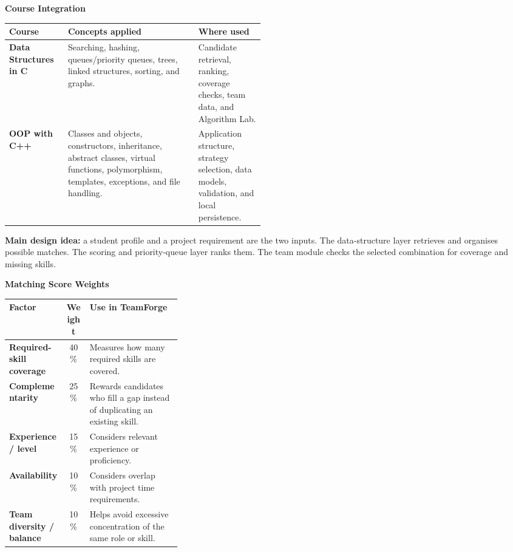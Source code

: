 \documentclass[a4paper,11pt]{article}
\begin{document}
\vspace{10pt}
\begin{answerbox}
\textbf{Course Integration}

\vspace{3pt}
\begin{tabularx}{\linewidth}{|>{\bfseries}p{0.23\linewidth}|X|p{0.26\linewidth}|}
\hline
Course & Concepts applied & Where used \\
\hline
Data Structures in C & Searching, hashing, queues/priority queues, trees, linked structures, sorting, and graphs. & Candidate retrieval, ranking, coverage checks, team data, and Algorithm Lab. \\
\hline
OOP with C++ & Classes and objects, constructors, inheritance, abstract classes, virtual functions, polymorphism, templates, exceptions, and file handling. & Application structure, strategy selection, data models, validation, and local persistence. \\
\hline
\end{tabularx}

\vspace{5pt}
\begin{softbox}
\textbf{Main design idea:} a student profile and a project requirement are the two inputs. The data-structure layer retrieves and organises possible matches. The scoring and priority-queue layer ranks them. The team module checks the selected combination for coverage and missing skills.
\end{softbox}
\end{answerbox}

\vspace{10pt}
\begin{answerbox}
\textbf{Matching Score Weights}

\vspace{3pt}
\begin{tabularx}{\linewidth}{|>{\bfseries}p{0.33\linewidth}|c|X|}
\hline
Factor & Weight & Use in TeamForge \\
\hline
Required-skill coverage & 40\% & Measures how many required skills are covered. \\
\hline
Complementarity & 25\% & Rewards candidates who fill a gap instead of duplicating an existing skill. \\
\hline
Experience / level & 15\% & Considers relevant experience or proficiency. \\
\hline
Availability & 10\% & Considers overlap with project time requirements. \\
\hline
Team diversity / balance & 10\% & Helps avoid excessive concentration of the same role or skill. \\
\hline
\end{tabularx}
\end{answerbox}
\end{document}
